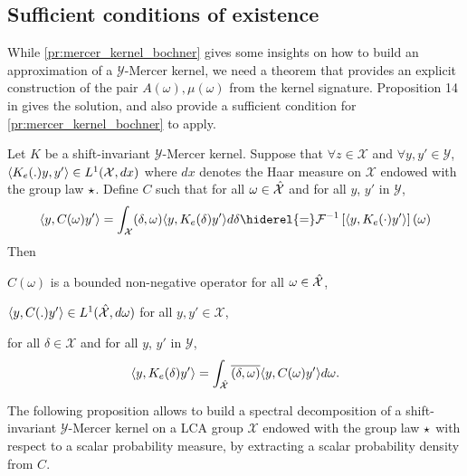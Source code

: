 \subsection{Sufficient conditions of existence}
\label{subsec:sufficient_conditions}
While \cref{pr:mercer_kernel_bochner} gives some insights on how to build an approximation of a $\mathcal{Y}$-Mercer kernel, we need a theorem that provides an explicit construction of the pair $A(\omega), \mu(\omega)$ from the kernel signature. Proposition 14 in \citet{Carmeli2010} gives the solution, and also provide a sufficient condition for \cref{pr:mercer_kernel_bochner} to apply.
\begin{proposition}
\label{pr:inverse_ovk_Fourier_decomposition}
Let $K$ be a shift-invariant $\mathcal{Y}$-Mercer kernel. %
Suppose that $\forall z \in \mathcal{X}$ and $\forall y ,y' \in\mathcal{Y}$, $\langle K_e(.)y,y'\rangle\in L^1(\mathcal{X},dx)$ where $dx$ denotes the Haar measure on $\mathcal{X}$ endowed with the group law $\star$. %
Define $C$ such that for all $\omega \in \hat{\mathcal{X}}$ and for all $y$, $y'$ in $\mathcal{Y}$,
\begin{dmath}\label{eq:CK0}
\inner{y,C(\omega)y'} = \int_{\mathcal{X}} \pairing{\delta, \omega}\inner{y, K_e(\delta)y'}d\delta \hiderel{=}\IFT{\inner{y, K_e(\cdot)y'}}(\omega)
\end{dmath}
Then
\begin{propenum}
\item $C(\omega)$ is a bounded non-negative operator for all $\omega \in \hat{\mathcal{X}}$,
\item $\langle y, C(.)y'\rangle\in L^1(\hat{\mathcal{X}},d\omega)$ for all $y,y'\in\mathcal{X}$,
\item for all $\delta\in\mathcal{X}$ and for all $y$, $y'$ in $\mathcal{Y}$,
\begin{dmath*}
\inner{y, K_e(\delta)y'}= \int_{\dual{\mathcal{X}}}\conj{\pairing{\delta,\omega}}\inner{y, C(\omega)y'}d\omega.
\end{dmath*}
\end{propenum}
\end{proposition}
The following proposition allows to build a spectral decomposition of a shift-invariant $\mathcal{Y}$-Mercer kernel on a \acs{LCA} group $\mathcal{X}$ endowed with the group law $\star$ with respect to a scalar probability measure, by extracting a scalar probability density from $C$.

